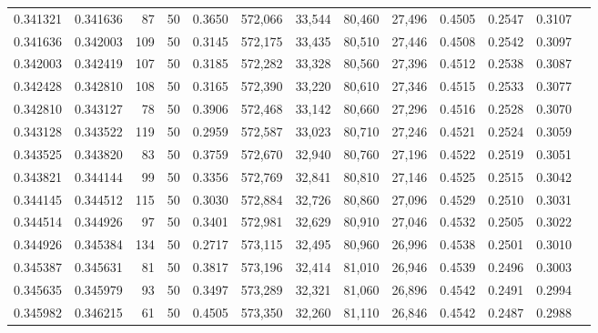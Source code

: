 \begin{tabular}{rrrrrrrrrrrrr}
0.341321 & 0.341636 &    87 &  50 &                                     0.3650 & 572,066 &  33,544 &  80,460 &  27,496 & 0.4505 & 0.2547 & 0.3107 \\
0.341636 & 0.342003 &   109 &  50 &                                     0.3145 & 572,175 &  33,435 &  80,510 &  27,446 & 0.4508 & 0.2542 & 0.3097 \\
0.342003 & 0.342419 &   107 &  50 &                                     0.3185 & 572,282 &  33,328 &  80,560 &  27,396 & 0.4512 & 0.2538 & 0.3087 \\
0.342428 & 0.342810 &   108 &  50 &                                     0.3165 & 572,390 &  33,220 &  80,610 &  27,346 & 0.4515 & 0.2533 & 0.3077 \\
0.342810 & 0.343127 &    78 &  50 &                                     0.3906 & 572,468 &  33,142 &  80,660 &  27,296 & 0.4516 & 0.2528 & 0.3070 \\
0.343128 & 0.343522 &   119 &  50 &                                     0.2959 & 572,587 &  33,023 &  80,710 &  27,246 & 0.4521 & 0.2524 & 0.3059 \\
0.343525 & 0.343820 &    83 &  50 &                                     0.3759 & 572,670 &  32,940 &  80,760 &  27,196 & 0.4522 & 0.2519 & 0.3051 \\
0.343821 & 0.344144 &    99 &  50 &                                     0.3356 & 572,769 &  32,841 &  80,810 &  27,146 & 0.4525 & 0.2515 & 0.3042 \\
0.344145 & 0.344512 &   115 &  50 &                                     0.3030 & 572,884 &  32,726 &  80,860 &  27,096 & 0.4529 & 0.2510 & 0.3031 \\
0.344514 & 0.344926 &    97 &  50 &                                     0.3401 & 572,981 &  32,629 &  80,910 &  27,046 & 0.4532 & 0.2505 & 0.3022 \\
0.344926 & 0.345384 &   134 &  50 &                                     0.2717 & 573,115 &  32,495 &  80,960 &  26,996 & 0.4538 & 0.2501 & 0.3010 \\
0.345387 & 0.345631 &    81 &  50 &                                     0.3817 & 573,196 &  32,414 &  81,010 &  26,946 & 0.4539 & 0.2496 & 0.3003 \\
0.345635 & 0.345979 &    93 &  50 &                                     0.3497 & 573,289 &  32,321 &  81,060 &  26,896 & 0.4542 & 0.2491 & 0.2994 \\
0.345982 & 0.346215 &    61 &  50 &                                     0.4505 & 573,350 &  32,260 &  81,110 &  26,846 & 0.4542 & 0.2487 & 0.2988 \\

\end{tabular}
